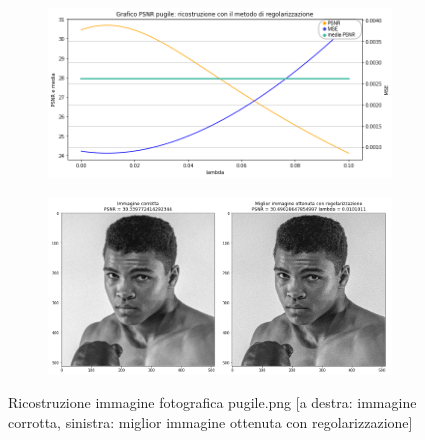 \begin{figure}[H]
    \centering
    \begin{subfigure}{0.5\textwidth}
        \includegraphics[width=\textwidth]{imgRicostruzione/graficoPugile_minimize.png}
    \end{subfigure}%
    \begin{subfigure}{0.5\textwidth}
        \centering
        \includegraphics[width=\textwidth]{imgRicostruzione/ricostruzionePugile_minimize.png}
    \end{subfigure}
    \caption{Ricostruzione immagine fotografica pugile.png [a destra: immagine corrotta, sinistra: miglior immagine ottenuta con regolarizzazione]}
    

\end{figure}
